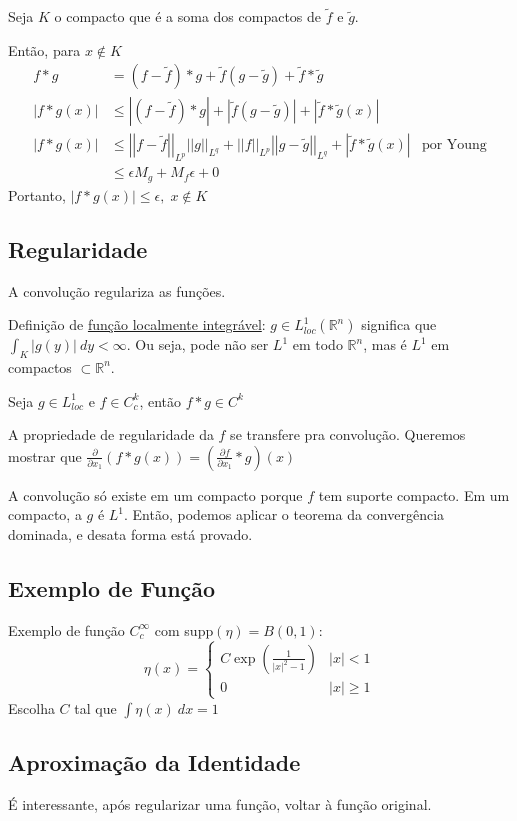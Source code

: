 \documentclass[11pt]{article}
\newcommand{\Rn}{{\mathbb{R}^n}}
\newcommand{\p}{\partial}
\newcommand{\e}{\epsilon}
\newcommand{\pde}[2]{\frac{\p #1}{\p #2}}
\newcommand{\norm}[2]{\left|\left|#1\right|\right|_{L^{#2}}}
\begin{document}
Seja \(K\) o compacto que é a soma dos compactos de \(\tilde{f}\) e \(\tilde{g}\).

Então, para \(x \notin K\)
\begin{align*}
	f*g &= (f - \tilde{f}) * g + \tilde{f}(g - \tilde{g}) + \tilde{f}*\tilde{g} \\
	|f*g (x)| &\leq |(f - \tilde{f}) * g| + |\tilde{f}(g - \tilde{g})| + |\tilde{f}*\tilde{g} (x)| \\
	|f*g (x)| &\leq \norm{f - \tilde{f}}{p}\norm{g}{q} + \norm{f}{p}\norm{g - \tilde{g}}{q} + \left| \tilde{f} * \tilde{g} (x) \right| & \text{por Young}\\
	&\leq \e M_g + M_f\e + 0 
\end{align*}
Portanto, \(\left| f*g(x)\right| \leq \e, \; x\notin K\)

\subsection{Regularidade}

A convolução regulariza as funções.

Definição de \href{https://en.wikipedia.org/wiki/Locally_integrable_function}{função localmente integrável}: \(g \in L^1_{loc}(\Rn)\) significa que \(\int_K |g(y)|\ dy < \infty\). Ou seja, pode não ser \(L^1\) em todo \(\Rn\), mas é \(L^1\) em compactos \(\subset \Rn\). 

Seja \( g \in L^1_{loc} \) e \( f \in C^k_c \), então \( f * g \in C^k \)

A propriedade de regularidade da \(f\) se transfere pra convolução. Queremos mostrar que \(\pde{}{x_1}\left( f*g(x)\right) = \left(\pde{f}{x_1} * g \right)(x)\)

A convolução só existe em um compacto porque \(f\) tem suporte compacto. Em um compacto, a \(g\) é \(L^1\). Então, podemos aplicar o teorema da convergência dominada, e desata forma está provado.

\subsection*{Exemplo de Função}
Exemplo de função \(C^{\infty}_{c}\) com supp\((\eta) = B(0,1)\): \[\eta(x) = \begin{cases}
	C \exp\left( \frac{1}{|x|^2 - 1}\right) & |x|<1 \\
	0 & |x| \geq 1 
\end{cases}\]
Escolha \(C\) tal que \(\int \eta(x)\ dx = 1\)

\subsection{Aproximação da Identidade}
É interessante, após regularizar uma função, voltar à função original.
\end{document}
